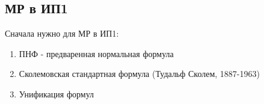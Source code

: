 

\title{}
\author{Козырнов Александр Дмитриевич, ИУ7-32Б}
\date{\today}


\subsection{МР в ИП1}


Сначала нужно для МР в ИП1:
\begin{enumerate}
    \item ПНФ - предваренная нормальная формула
    \item Сколемовская стандартная формула (Тудальф Сколем, 1887-1963)
    \item Унификация формул
\end{enumerate}


